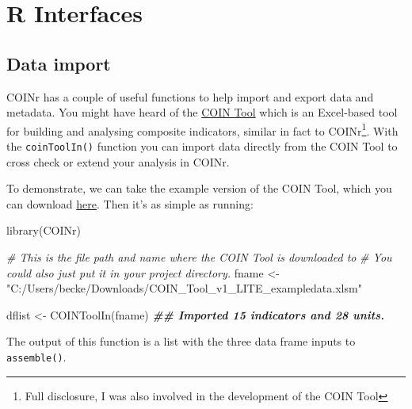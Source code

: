 \documentclass[
]{book}
\newenvironment{Shaded}{\begin{snugshade}}{\end{snugshade}}
\newcommand{\CommentTok}[1]{\textcolor[rgb]{0.56,0.35,0.01}{\textit{#1}}}
\newcommand{\DocumentationTok}[1]{\textcolor[rgb]{0.56,0.35,0.01}{\textbf{\textit{#1}}}}
\newcommand{\FunctionTok}[1]{\textcolor[rgb]{0.00,0.00,0.00}{#1}}
\newcommand{\NormalTok}[1]{#1}
\newcommand{\OtherTok}[1]{\textcolor[rgb]{0.56,0.35,0.01}{#1}}
\newcommand{\StringTok}[1]{\textcolor[rgb]{0.31,0.60,0.02}{#1}}
\begin{document}
\hypertarget{r-interfaces}{%
\section{R Interfaces}\label{r-interfaces}}

\hypertarget{data-import}{%
\subsection{Data import}\label{data-import}}

COINr has a couple of useful functions to help import and export data and metadata. You might have heard of the \href{https://knowledge4policy.ec.europa.eu/composite-indicators/coin-tool_en}{COIN Tool} which is an Excel-based tool for building and analysing composite indicators, similar in fact to COINr\footnote{Full disclosure, I was also involved in the development of the COIN Tool}. With the \texttt{coinToolIn()} function you can import data directly from the COIN Tool to cross check or extend your analysis in COINr.

To demonstrate, we can take the example version of the COIN Tool, which you can download \href{https://composite-indicators.jrc.ec.europa.eu/sites/default/files/COIN_Tool_v1_LITE_exampledata.xlsm}{here}. Then it's as simple as running:

\begin{Shaded}
\begin{Highlighting}[]
\FunctionTok{library}\NormalTok{(COINr)}

\CommentTok{\# This is the file path and name where the COIN Tool is downloaded to}
\CommentTok{\# You could also just put it in your project directory.}
\NormalTok{fname }\OtherTok{\textless{}{-}} \StringTok{"C:/Users/becke/Downloads/COIN\_Tool\_v1\_LITE\_exampledata.xlsm"}

\NormalTok{dflist }\OtherTok{\textless{}{-}} \FunctionTok{COINToolIn}\NormalTok{(fname)}
\DocumentationTok{\#\# Imported 15 indicators and 28 units.}
\end{Highlighting}
\end{Shaded}

The output of this function is a list with the three data frame inputs to \texttt{assemble()}.
\end{document}
